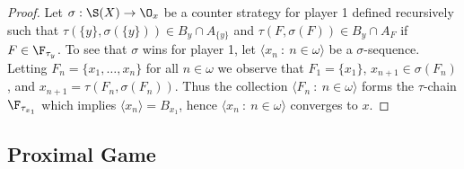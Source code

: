 \documentclass{article}
\begin{document}
\begin{proof}
    Let \(\sigma: \S(X) \to \O_x\) be a counter strategy for player 1 defined recursively such that \(\tau(\{y\}, \sigma(\{y\})) \in B_y \cap A_{\{y\}}\) and \(\tau(F, \sigma(F)) \in B_y\cap A_F\) if \(F \in \F_{\tau_y}\). To see that \(\sigma\) wins for player 1, let \(\langle x_n \: : \: n \in \omega\rangle\) be a \(\sigma\)-sequence. Letting \(F_n = \{x_1, \dots, x_n\}\) for all \(n \in \omega\) we observe that \(F_1 = \{x_1\}\), \(x_{n + 1} \in \sigma(F_n)\), and \(x_{n+1} = \tau(F_n, \sigma(F_n))\). Thus the collection \(\langle F_n \: : \: n \in \omega\rangle\) forms the \(\tau\)-chain \(\F_{\tau_{x_1}}\) which implies \(\langle x_n \rangle = B_{x_1}\), hence \(\langle x_n \: : \: n \in \omega\rangle\) converges to \(x\).
\end{proof}

\subsection{Proximal Game}
\end{document}
